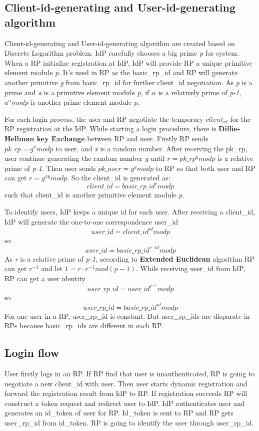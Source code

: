 \subsection{Client-id-generating and User-id-generating algorithm}
Client-id-generating and User-id-generating algorithm are created based on Discrete Logarithm problem\cite{shiu2007cryptography:}.
IdP carefully chooses a big prime \emph{p}\cite{rfc3526} for system. When a RP initialize registration at IdP, IdP will provide RP a unique primitive element module \emph{p}. It's used in RP as the basic\_rp\_id and RP will generate another primitive \emph{g} from basic\_rp\_id for further client\_id negotiation. As \emph{p} is a prime and \emph{a} is a primitive element module \emph{p}, if $\alpha$ is a relatively prime of \emph{p-1}, $a^\alpha mod p$ is another prime element module \emph{p}.

For each login process, the user and RP negotiate the temporary $client_{id}$ for the RP registration at the IdP.
While starting a login procedure, there is \textbf{Diffie-Hellman key Exchange}\cite{DiffieH76} between RP and user. Firstly RP sends $pk\_rp=g^x mod p$ to user, and \emph{x} is a random number. After receiving the pk\_rp, user continue generating the random number \emph{y} until $r=pk\_rp^y mod p$ is a relative prime of \emph{p-1}. Then user sends $pk\_user=g^y mod p$ to RP so that both user and RP can get $r=g^{xy} mod p$. So the client\_id is generated as: $$client\_id=basic\_rp\_id^r mod p$$ such that client\_id is another primitive element module \emph{p}.

To identify users, IdP keeps a unique id for each user. After receiving a client\_id, IdP will generate the one-to-one correspondence user\_id$$user\_id=client\_id^{id} mod p$$so$$user\_id=basic\_rp\_id^{r\cdot id}modp$$
As \emph{r} is a relative prime of \emph{p-1}, according to \textbf{Extended Euclidean} algorithm RP can get $r^{-1}$ and let $1=r\cdot r^{-1} mod (p-1)$. While receiving user\_id from IdP, RP can get a user identity $$user\_rp\_id=user\_id^{r^{-1}} mod p$$so$$user\_rp\_id=basic\_rp\_id^{id} mod p$$For one user in a RP, user\_rp\_id is constant. But  user\_rp\_ids are disparate in RPs because basic\_rp\_ids are different in each RP.

\subsection{Login flow}
User firstly logs in an RP. If RP find that user is unauthenticated, RP is going to negotiate a new client\_id with user. Then user starts dynamic registration and forward the registration result from IdP to RP. If registration succeeds RP will construct a token request and redirect user to IdP. IdP authenticates user and generates an id\_token of user for RP. Id\_token is sent to RP and RP gets user\_rp\_id from id\_token. RP is going to identify the user through user\_rp\_id. 

